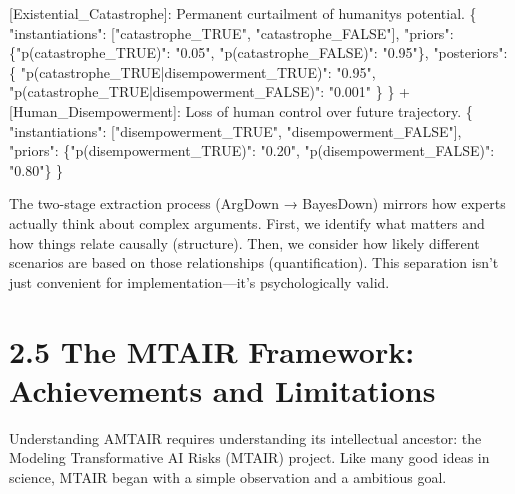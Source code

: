 \documentclass[
  11pt,
  letterpaper,
]{book}
\newenvironment{Shaded}{\begin{snugshade}}{\end{snugshade}}
\newcommand{\DataTypeTok}[1]{\textcolor[rgb]{0.68,0.00,0.00}{#1}}
\newcommand{\ErrorTok}[1]{\textcolor[rgb]{0.68,0.00,0.00}{#1}}
\newcommand{\FunctionTok}[1]{\textcolor[rgb]{0.28,0.35,0.67}{#1}}
\newcommand{\OtherTok}[1]{\textcolor[rgb]{0.00,0.23,0.31}{#1}}
\newcommand{\StringTok}[1]{\textcolor[rgb]{0.13,0.47,0.30}{#1}}
\begin{document}
\begin{Shaded}
\begin{Highlighting}[]
\OtherTok{[}\ErrorTok{Existential\_Catastrophe}\OtherTok{]}\ErrorTok{:} \ErrorTok{Permanent} \ErrorTok{curtailment} \ErrorTok{of} \ErrorTok{humanity\textquotesingle{}s} \ErrorTok{potential.} \FunctionTok{\{}
  \DataTypeTok{"instantiations"}\FunctionTok{:} \OtherTok{[}\StringTok{"catastrophe\_TRUE"}\OtherTok{,} \StringTok{"catastrophe\_FALSE"}\OtherTok{]}\FunctionTok{,}
  \DataTypeTok{"priors"}\FunctionTok{:} \FunctionTok{\{}\DataTypeTok{"p(catastrophe\_TRUE)"}\FunctionTok{:} \StringTok{"0.05"}\FunctionTok{,} \DataTypeTok{"p(catastrophe\_FALSE)"}\FunctionTok{:} \StringTok{"0.95"}\FunctionTok{\},}
  \DataTypeTok{"posteriors"}\FunctionTok{:} \FunctionTok{\{}
    \DataTypeTok{"p(catastrophe\_TRUE|disempowerment\_TRUE)"}\FunctionTok{:} \StringTok{"0.95"}\FunctionTok{,}
    \DataTypeTok{"p(catastrophe\_TRUE|disempowerment\_FALSE)"}\FunctionTok{:} \StringTok{"0.001"}
  \FunctionTok{\}}
\FunctionTok{\}}
 \ErrorTok{+} \OtherTok{[}\ErrorTok{Human\_Disempowerment}\OtherTok{]}\ErrorTok{:} \ErrorTok{Loss} \ErrorTok{of} \ErrorTok{human} \ErrorTok{control} \ErrorTok{over} \ErrorTok{future} \ErrorTok{trajectory.} \FunctionTok{\{}
   \DataTypeTok{"instantiations"}\FunctionTok{:} \OtherTok{[}\StringTok{"disempowerment\_TRUE"}\OtherTok{,} \StringTok{"disempowerment\_FALSE"}\OtherTok{]}\FunctionTok{,}
   \DataTypeTok{"priors"}\FunctionTok{:} \FunctionTok{\{}\DataTypeTok{"p(disempowerment\_TRUE)"}\FunctionTok{:} \StringTok{"0.20"}\FunctionTok{,} \DataTypeTok{"p(disempowerment\_FALSE)"}\FunctionTok{:} \StringTok{"0.80"}\FunctionTok{\}}
 \FunctionTok{\}}
\end{Highlighting}
\end{Shaded}

The two-stage extraction process (ArgDown → BayesDown) mirrors how
experts actually think about complex arguments. First, we identify what
matters and how things relate causally (structure). Then, we consider
how likely different scenarios are based on those relationships
(quantification). This separation isn't just convenient for
implementation---it's psychologically valid.

\section{2.5 The MTAIR Framework: Achievements and
Limitations}\label{sec-mtair-framework}

Understanding AMTAIR requires understanding its intellectual ancestor:
the Modeling Transformative AI Risks (MTAIR) project. Like many good
ideas in science, MTAIR began with a simple observation and a ambitious
goal.
\end{document}
